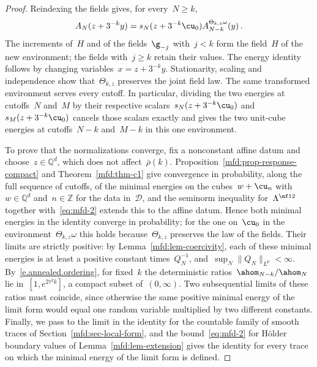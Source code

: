 \documentclass[11pt]{amsart}
\begin{document}
\begin{proof}
Reindexing the fields gives, for every~$N\geq k$,
\begin{equation*}
	A_N(z+3^{-k}y)=s_N(z+3^{-k}\cu_0)A_{N-k}^{\Theta_{k,z}\omega}(y)\,.
\end{equation*}
The increments of~$H$ and of the fields~$\g_{-j}$ with~$j<k$ form the field~$H$ of the new environment; the fields with~$j\geq k$ retain their values. The energy identity follows by changing variables~$x=z+3^{-k}y$. Stationarity, scaling and independence show that~$\Theta_{k,z}$ preserves the joint field law. The same transformed environment serves every cutoff. In particular, dividing the two energies at cutoffs~$N$ and~$M$ by their respective scalars~$s_N(z+3^{-k}\cu_0)$ and~$s_M(z+3^{-k}\cu_0)$ cancels those scalars exactly and gives the two unit-cube energies at cutoffs~$N-k$ and~$M-k$ in this one environment.

\smallskip

To prove that the normalizations converge, fix a nonconstant affine datum and choose~$z\in\mathbb Q^d$, which does not affect~$\bar\rho(k)$. Proposition~\ref{mfd:prop-response-compact} and Theorem~\ref{mfd:thm-c1} give convergence in probability, along the full sequence of cutoffs, of the minimal energies on the cubes~$w+\cu_n$ with~$w\in\mathbb Q^d$ and~$n\in\mathbb Z$ for the data in~$\mathcal D$, and the seminorm inequality for~$\Lambda^{\nf12}$ together with~\eqref{eq:mfd-2} extends this to the affine datum. Hence both minimal energies in the identity converge in probability; for the one on~$\cu_0$ in the environment~$\Theta_{k,z}\omega$ this holds because~$\Theta_{k,z}$ preserves the law of the fields. Their limits are strictly positive: by Lemma~\ref{mfd:lem-coercivity}, each of these minimal energies is at least a positive constant times~$Q_N^{-1}$, and~$\sup_N\|Q_N\|_{L^p}<\infty$. By~\eqref{e.annealed.ordering}, for fixed~$k$ the deterministic ratios~$\ahom_{N-k}/\ahom_N$ lie in~$[1,e^{2\tau^2k}]$, a compact subset of~$(0,\infty)$. Two subsequential limits of these ratios must coincide, since otherwise the same positive minimal energy of the limit form would equal one random variable multiplied by two different constants. Finally, we pass to the limit in the identity for the countable family of smooth traces of Section~\ref{mfd:sec-local-form}, and the bound~\eqref{eq:mfd-2} for H\"older boundary values of Lemma~\ref{mfd:lem-extension} gives the identity for every trace on which the minimal energy of the limit form is defined.
\end{proof}
\end{document}
